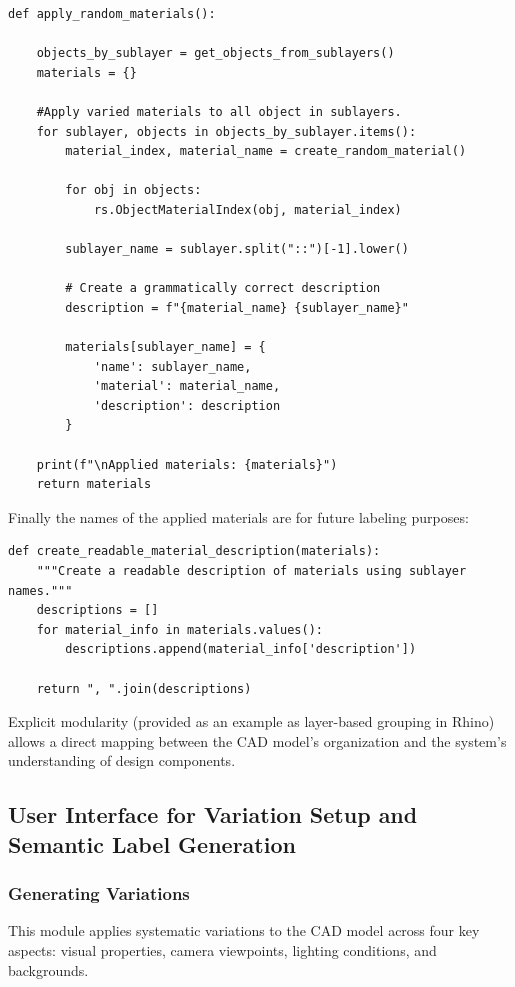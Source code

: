 \documentclass[12pt]{article}
\begin{document}
\begin{verbatim}
def apply_random_materials():

    objects_by_sublayer = get_objects_from_sublayers()
    materials = {}
    
    #Apply varied materials to all object in sublayers.
    for sublayer, objects in objects_by_sublayer.items():
        material_index, material_name = create_random_material()
        
        for obj in objects:
            rs.ObjectMaterialIndex(obj, material_index)
        
        sublayer_name = sublayer.split("::")[-1].lower()
        
        # Create a grammatically correct description
        description = f"{material_name} {sublayer_name}"
        
        materials[sublayer_name] = {
            'name': sublayer_name,
            'material': material_name,
            'description': description
        }
    
    print(f"\nApplied materials: {materials}")
    return materials

\end{verbatim}  

Finally the names of the applied materials are for future labeling purposes:
\begin{verbatim}
def create_readable_material_description(materials):
    """Create a readable description of materials using sublayer names."""
    descriptions = []
    for material_info in materials.values():
        descriptions.append(material_info['description'])
    
    return ", ".join(descriptions)
\end{verbatim}  

Explicit modularity (provided as an example as layer-based grouping in Rhino) allows a direct mapping between the CAD model's organization and the system's understanding of design components.

\subsection{User Interface for Variation Setup and Semantic Label Generation}

\subsubsection{Generating Variations}
This module applies systematic variations to the CAD model across four key aspects: visual properties, camera viewpoints, lighting conditions, and backgrounds.
\end{document}
